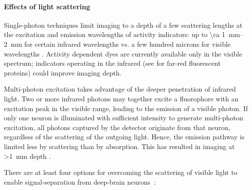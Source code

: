 \paragraph{Effects of light scattering}
Single-photon techniques limit imaging to a depth of a few scattering lengths at the excitation and emission wavelengths of activity indicators: up to \SIrange{\ca 1}{2}{\milli\meter} for certain infrared wavelengths \cite{horton13,kobat09,Kobat2011} vs. a few hundred microns for visible wavelengths \cite{Wilt2009}.
Activity dependent dyes are currently available only in the visible spectrum; indicators operating in the infrared (see \cite{filonov11,shcherbakova13, Shcherbo2009} for far-red fluorescent proteins) could improve imaging depth.

Multi-photon excitation takes advantage of the deeper penetration of infrared light.
Two or more infrared photons may together excite a fluorophore with an excitation peak in the visible range, leading to the emission of a visible photon.
If only one neuron is illuminated with sufficient intensity to generate multi-photon excitation, all photons captured by the detector originate from that neuron, regardless of the scattering of the outgoing light. Hence, the emission pathway is limited less by scattering than by absorption.
This has resulted in imaging at \SI{>1}{\milli\meter} depth \cite{horton13,kobat09, Kobat2011}.

There are at least four options for overcoming the scattering of visible light to enable signal-separation from deep-brain neurons~\cite{alivisatos2012brain, alivisatos13}:

